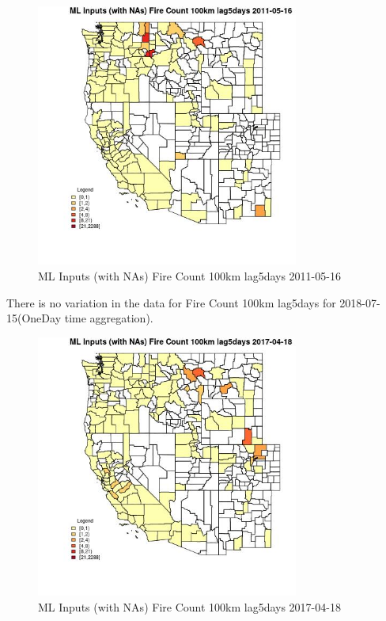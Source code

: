 \begin{figure} 
\centering  
\includegraphics[width=0.77\textwidth]{Code_Outputs/Report_ML_input_PM25_Step4_part_e_de_duplicated_aves_compiled_2019-05-21wNAs_CountyFire_Count_100km_lag5daysMean2011-05-16.jpg} 
\caption{\label{fig:Report_ML_input_PM25_Step4_part_e_de_duplicated_aves_compiled_2019-05-21wNAsCountyFire_Count_100km_lag5daysMean2011-05-16}ML Inputs (with NAs) Fire Count 100km lag5days 2011-05-16} 
\end{figure} 
 

There is no variation in the data for Fire Count 100km lag5days for 2018-07-15(OneDay time aggregation). 
 

\begin{figure} 
\centering  
\includegraphics[width=0.77\textwidth]{Code_Outputs/Report_ML_input_PM25_Step4_part_e_de_duplicated_aves_compiled_2019-05-21wNAs_CountyFire_Count_100km_lag5daysMean2017-04-18.jpg} 
\caption{\label{fig:Report_ML_input_PM25_Step4_part_e_de_duplicated_aves_compiled_2019-05-21wNAsCountyFire_Count_100km_lag5daysMean2017-04-18}ML Inputs (with NAs) Fire Count 100km lag5days 2017-04-18} 
\end{figure} 
 

